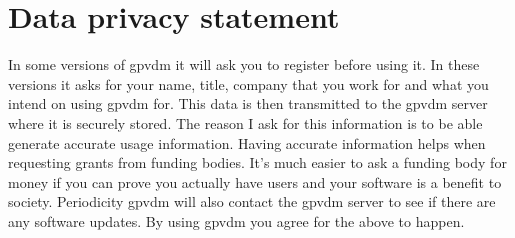\newpage
\section{Data privacy statement}
In some versions of gpvdm it will ask you to register before using it.  In these versions it asks for your name, title, company that you work for and what you intend on using gpvdm for.  This data is then transmitted to the gpvdm server where it is securely stored. The reason I ask for this information is to be able generate accurate usage information. Having accurate information helps when requesting grants from funding bodies.  It's much easier to ask a funding body for money if you can prove you actually have users and your software is a benefit to society. Periodicity gpvdm will also contact the gpvdm server to see if there are any software updates. By using gpvdm you agree for the above to happen.
